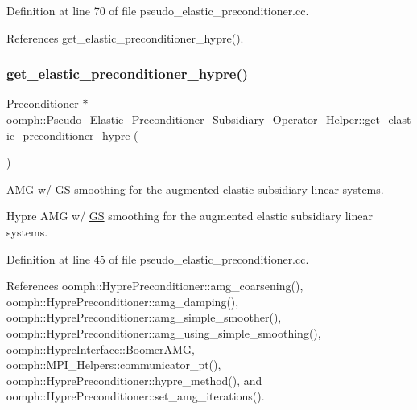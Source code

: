 Definition at line 70 of file pseudo\+\_\+elastic\+\_\+preconditioner.\+cc.



References get\+\_\+elastic\+\_\+preconditioner\+\_\+hypre().

\mbox{\label{namespaceoomph_1_1Pseudo__Elastic__Preconditioner__Subsidiary__Operator__Helper_aedfcfd828b599566ad795d22850a6960}} 
\subsubsection{\texorpdfstring{get\+\_\+elastic\+\_\+preconditioner\+\_\+hypre()}{get\_elastic\_preconditioner\_hypre()}}
{\footnotesize\ttfamily \hyperlink{classoomph_1_1Preconditioner}{Preconditioner} $\ast$ oomph\+::\+Pseudo\+\_\+\+Elastic\+\_\+\+Preconditioner\+\_\+\+Subsidiary\+\_\+\+Operator\+\_\+\+Helper\+::get\+\_\+elastic\+\_\+preconditioner\+\_\+hypre (\begin{DoxyParamCaption}{ }\end{DoxyParamCaption})}



A\+MG w/ \hyperlink{classoomph_1_1GS}{GS} smoothing for the augmented elastic subsidiary linear systems. 

Hypre A\+MG w/ \hyperlink{classoomph_1_1GS}{GS} smoothing for the augmented elastic subsidiary linear systems. 

Definition at line 45 of file pseudo\+\_\+elastic\+\_\+preconditioner.\+cc.



References oomph\+::\+Hypre\+Preconditioner\+::amg\+\_\+coarsening(), oomph\+::\+Hypre\+Preconditioner\+::amg\+\_\+damping(), oomph\+::\+Hypre\+Preconditioner\+::amg\+\_\+simple\+\_\+smoother(), oomph\+::\+Hypre\+Preconditioner\+::amg\+\_\+using\+\_\+simple\+\_\+smoothing(), oomph\+::\+Hypre\+Interface\+::\+Boomer\+A\+MG, oomph\+::\+M\+P\+I\+\_\+\+Helpers\+::communicator\+\_\+pt(), oomph\+::\+Hypre\+Preconditioner\+::hypre\+\_\+method(), and oomph\+::\+Hypre\+Preconditioner\+::set\+\_\+amg\+\_\+iterations().



